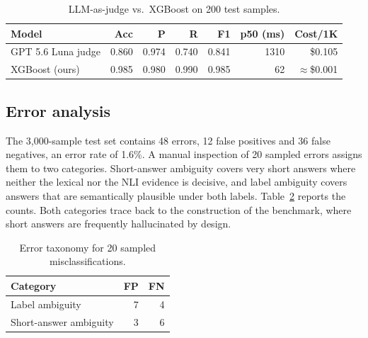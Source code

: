 \begin{table}[t]
\centering
\small
\caption{LLM-as-judge vs.\ XGBoost on 200 test samples.}
\label{tab:judge}
\begin{tabular}{@{}lrrrrrr@{}}
\toprule
\textbf{Model} & \textbf{Acc} & \textbf{P} & \textbf{R} & \textbf{F1} & \textbf{p50 (ms)} & \textbf{Cost/1K} \\
\midrule
GPT 5.6 Luna judge & 0.860 & 0.974 & 0.740 & 0.841 & 1310 & \$0.105 \\
XGBoost (ours)     & 0.985 & 0.980 & 0.990 & 0.985 & 62   & $\approx$\$0.001 \\
\bottomrule
\end{tabular}
\end{table}

\subsection{Error analysis}

The 3{,}000-sample test set contains 48 errors, 12 false positives and 36 false negatives, an error rate of 1.6\%. A manual inspection of 20 sampled errors assigns them to two categories. Short-answer ambiguity covers very short answers where neither the lexical nor the NLI evidence is decisive, and label ambiguity covers answers that are semantically plausible under both labels. Table~\ref{tab:errors} reports the counts. Both categories trace back to the construction of the benchmark, where short answers are frequently hallucinated by design.

\begin{table}[H]
\centering
\small
\begin{tabular}{@{}lrr@{}}
\toprule
\textbf{Category} & \textbf{FP} & \textbf{FN} \\
\midrule
Label ambiguity       & 7 & 4 \\
Short-answer ambiguity& 3 & 6 \\
\bottomrule
\end{tabular}
\caption{Error taxonomy for 20 sampled misclassifications.}
\label{tab:errors}
\end{table}
